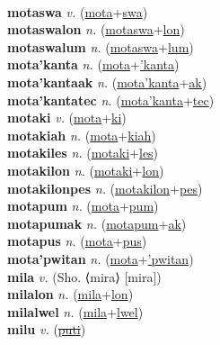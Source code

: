  \label{motacutalawtak} \\
\textbf{motaswa} \textit{v.} (\hyperref[mota]{mota}+\hyperref[swa]{swa})
 \label{motaswa} \\
\textbf{motaswalon} \textit{n.} (\hyperref[motaswa]{motaswa}+\hyperref[lon]{lon})
 \label{motaswalon} \\
\textbf{motaswalum} \textit{n.} (\hyperref[motaswa]{motaswa}+\hyperref[lum]{lum})
 \label{motaswalum} \\
\textbf{mota'kanta} \textit{n.} (\hyperref[mota]{mota}+\hyperref['kanta]{'kanta})
 \label{mota'kanta} \\
\textbf{mota'kantaak} \textit{n.} (\hyperref[mota'kanta]{mota'kanta}+\hyperref[ak]{ak})
 \label{mota'kantaak} \\
\textbf{mota'kantatec} \textit{n.} (\hyperref[mota'kanta]{mota'kanta}+\hyperref[tec]{tec})
 \label{mota'kantatec} \\
\textbf{motaki} \textit{v.} (\hyperref[mota]{mota}+\hyperref[ki]{ki})
 \label{motaki} \\
\textbf{motakiah} \textit{n.} (\hyperref[mota]{mota}+\hyperref[kiah]{kiah})
 \label{motakiah} \\
\textbf{motakiles} \textit{n.} (\hyperref[motaki]{motaki}+\hyperref[les]{les})
 \label{motakiles} \\
\textbf{motakilon} \textit{n.} (\hyperref[motaki]{motaki}+\hyperref[lon]{lon})
 \label{motakilon} \\
\textbf{motakilonpes} \textit{n.} (\hyperref[motakilon]{motakilon}+\hyperref[pes]{pes})
 \label{motakilonpes} \\
\textbf{motapum} \textit{n.} (\hyperref[mota]{mota}+\hyperref[pum]{pum})
 \label{motapum} \\
\textbf{motapumak} \textit{n.} (\hyperref[motapum]{motapum}+\hyperref[ak]{ak})
 \label{motapumak} \\
\textbf{motapus} \textit{n.} (\hyperref[mota]{mota}+\hyperref[pus]{pus})
 \label{motapus} \\
\textbf{mota'pwitan} \textit{n.} (\hyperref[mota]{mota}+\hyperref['pwitan]{'pwitan})
 \label{mota'pwitan} \\
\textbf{mila} \textit{v.} (Sho. ⟨mira⟩ [mira])
 \label{mila} \\
\textbf{milalon} \textit{n.} (\hyperref[mila]{mila}+\hyperref[lon]{lon})
 \label{milalon} \\
\textbf{milalwel} \textit{n.} (\hyperref[mila]{mila}+\hyperref[lwel]{lwel})
 \label{milalwel} \\
\textbf{milu} \textit{v.} (\hyperref[puti]{\sout{puti}})
